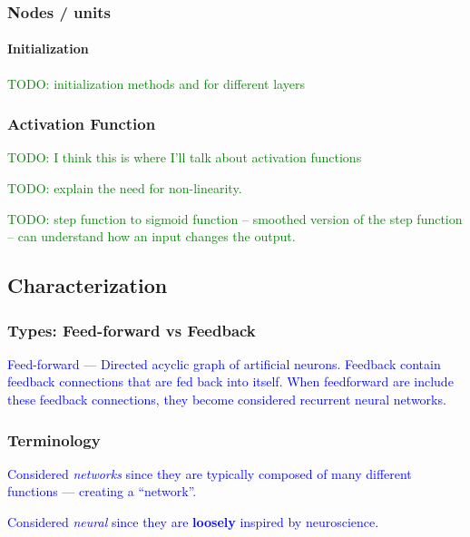 \subsubsection{Nodes / units}

\paragraph{Initialization}

\textcolor{green}{TODO: initialization methods and for different layers}



\subsubsection{Activation Function}

\textcolor{green}{TODO: I think this is where I'll talk about activation functions}

\textcolor{green}{TODO: explain the need for non-linearity.}

\textcolor{green}{TODO: step function to sigmoid function -- smoothed version of the step function -- can understand how an input changes the output.}


\subsection{Characterization}

\subsubsection{Types: Feed-forward vs Feedback}

\textcolor{blue}{Feed-forward --- Directed acyclic graph of artificial neurons. Feedback contain feedback connections that are fed back into itself. When feedforward are include these feedback connections, they become considered recurrent neural networks.}

\subsubsection{Terminology}

\textcolor{blue}{Considered \textit{networks} since they are typically composed of many different functions --- creating a ``network''.}

\textcolor{blue}{Considered \textit{neural} since they are \textbf{loosely} inspired by neuroscience.}

